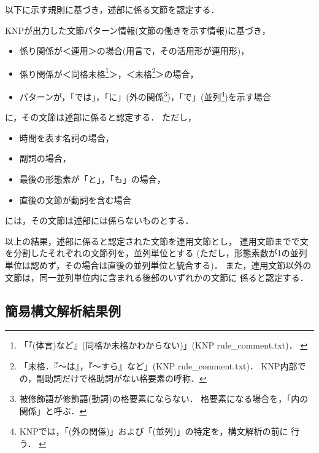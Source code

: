 以下に示す規則に基づき，述部に係る文節を認定する．

KNPが出力した文節パターン情報(文節の働きを示す情報)に基づき，
\begin{itemize}
 \item 係り関係が＜連用＞の場合(用言で，その活用形が連用形)，
 \item 係り関係が＜同格未格\footnote{
       「『(体言)など』(同格か未格かわからない)」(KNP rule\_comment.txt)．
       \label{part:006}
       }＞，＜未格\footnote{
       「未格．『〜は』，『〜すら』など」(KNP rule\_comment.txt)．
       KNP内部での，副助詞だけで格助詞がない格要素の呼称．
       }＞の場合，
 \item パターンが，「では」，「に」(外の関係\footnote{
       被修飾語が修飾語(動詞)の格要素にならない\cite{youyaku_ruikei}．
       格要素になる場合を，「内の関係」と呼ぶ．})，「で」(並列\footnote{
       KNPでは，「(外の関係)」および「(並列)」の特定を，構文解析の前に
       行う．
       \label{part:007}
       })を示す場合
\end{itemize}
に，その文節は述部に係ると認定する．
ただし，
\begin{itemize}
 \item 時間を表す名詞の場合，
 \item 副詞の場合，
 \item 最後の形態素が「と」，「も」の場合，
 \item 直後の文節が動詞を含む場合
\end{itemize}
には，その文節は述部には係らないものとする．

以上の結果，述部に係ると認定された文節を連用文節とし，
連用文節までで文を分割したそれぞれの文節列を，並列単位とする
(ただし，形態素数が1の並列単位は認めず，その場合は直後の並列単位と統合する)．
また，連用文節以外の文節は，同一並列単位内に含まれる後部のいずれかの文節に
係ると認定する．
\label{part:000}

\subsection{簡易構文解析結果例}
\label{section:koubunkaisekirei}

